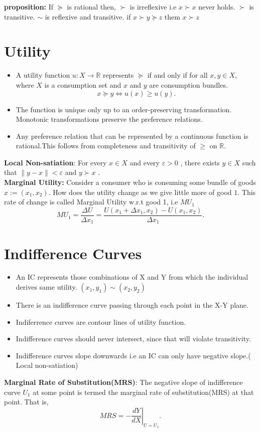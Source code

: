 \documentclass{tufte-handout}
\begin{document}
\textbf{proposition:} If $\succeq$ is rational then, $\succ$ is irreflexive i.e $x \succ x$ never holds. $\succ$ is transitive. $\sim $ is reflexive and transitive.  if  $x \succ y \succeq z$ them  $ x \succ z$







\section*{Utility}


\begin{itemize}
		\item A utility function $u:X \to \mathbb{R} $ represents $\succeq$ if and only if for all  $x,y \in X$, where $X$ is a consumption set and  $x$ and  $y$ are consumption bundles.
				\[
				x \succeq y \Longleftrightarrow u(x) \geq u(y)
				.\] 
		\item The function is unique only up to an order-preserving transformation. Monotonic transformations preserve the preference relations.
		\item Any preference relation that can be represented by a continuous function is rational.This follows from completeness and transitivity of $\geq$ on $\mathbb{R}$. 		
\end{itemize}
\textbf{Local Non-satiation}: For every $ x \in X$ and every $\varepsilon > 0$ , there exists  $ y \in X$ such that  $\|y - x\| < \varepsilon$  and  $ y \succ x$
. \\
\textbf{Marginal Utility:} Consider a consumer who is consuming some bundle of goods $x := (x_1, x_2)$. How does the utility change as we give little more of good $1$. This rate of change is called Marginal Utility w.r.t good 1, i.e $MU_1$
\[	MU_1 = \frac{\Delta U}{\Delta x_1} = \frac{U(x_1 + \Delta x_1, x_2) - U(x_1,x_2)}{\Delta x_1} 
.\]

\section*{Indifference Curves}

\begin{itemize}
		\item An IC represents those combinations of X and Y from which the individual derives same utility. $(x_1, y_1) \sim (x_2, y_2)$
		\item There is an indifference curve passing through each point in the X-Y plane.
		\item Indiferrence curves are contour lines of utility function.
		\item Indifference curves should never intersect, since that will violate transitivity.
		\item Indifference curves slope downwards i.e an IC can only have negative slope.( Local non-satiation)
\end{itemize}
\textbf{Marginal Rate of Substitution(MRS)}: The negative slope of indifference curve $U_1$ at some point is termed the marginal rate of substitution(MRS) at that point. That is,  \[
		MRS = \left. -\frac{dY}{dX} \right|_{U=U_1}
.\]
\end{document}
